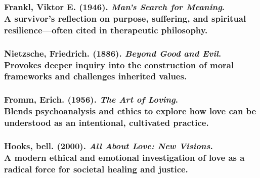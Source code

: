 \subsubsection{\texorpdfstring{\textbf{Frankl, Viktor E.} (1946).
\emph{Man's Search for Meaning}.\\
A survivor's reflection on purpose, suffering, and spiritual
resilience---often cited in therapeutic
philosophy.}{Frankl, Viktor E. (1946). Man's Search for Meaning. A survivor's reflection on purpose, suffering, and spiritual resilience---often cited in therapeutic philosophy.}}\label{frankl-viktor-e.-1946.-mans-search-for-meaning.-a-survivors-reflection-on-purpose-suffering-and-spiritual-resilienceoften-cited-in-therapeutic-philosophy.}

\subsubsection{\texorpdfstring{\textbf{Nietzsche, Friedrich.} (1886).
\emph{Beyond Good and Evil}.\\
Provokes deeper inquiry into the construction of moral frameworks and
challenges inherited
values.}{Nietzsche, Friedrich. (1886). Beyond Good and Evil. Provokes deeper inquiry into the construction of moral frameworks and challenges inherited values.}}\label{nietzsche-friedrich.-1886.-beyond-good-and-evil.-provokes-deeper-inquiry-into-the-construction-of-moral-frameworks-and-challenges-inherited-values.}

\subsubsection{\texorpdfstring{\textbf{Fromm, Erich. (1956).} \emph{The Art
of Loving}.\\
Blends psychoanalysis and ethics to explore how love can be understood
as an intentional, cultivated
practice.}{Fromm, Erich. (1956). The Art of Loving. Blends psychoanalysis and ethics to explore how love can be understood as an intentional, cultivated practice.}}\label{fromm-erich.-1956.-the-art-of-loving.-blends-psychoanalysis-and-ethics-to-explore-how-love-can-be-understood-as-an-intentional-cultivated-practice.}

\subsubsection{\texorpdfstring{\textbf{Hooks, bell. (2000).} \emph{All
About Love: New Visions}.\\
A modern ethical and emotional investigation of love as a radical force
for societal healing and
justice.}{Hooks, bell. (2000). All About Love: New Visions. A modern ethical and emotional investigation of love as a radical force for societal healing and justice.}}\label{hooks-bell.-2000.-all-about-love-new-visions.-a-modern-ethical-and-emotional-investigation-of-love-as-a-radical-force-for-societal-healing-and-justice.}

